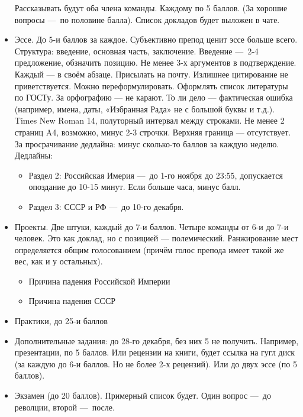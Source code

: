 \documentclass[12pt, a4paper]{article}
\begin{document}
\begin{itemize}
        Рассказывать будут оба члена команды. Каждому по 5 баллов. (За хорошие вопросы — по половине балла). 
        Список докладов будет выложен в чате.
        \item Эссе. До 5-и баллов за каждое. Субъективно препод ценит эссе больше всего. Структура: введение, основная часть, заключение.
        Введение — 2-4 предложение, обзначить позицию.
        Не менее 3-х аргументов в подтверждение. Каждый — в своём абзаце. Присылать на почту. 
        Излишнее цитирование не приветствуется. Можно переформулировать.
        Оформлять список литературы по ГОСТу.
        За орфографию — не карают. То ли дело — фактическая ошибка (например, имена, даты, «Избранная Рада» не с большой буквы и т.д.).
        Times New Roman 14, полуторный интервал между строками. Не менее 2 страниц A4, возможно, минус 2-3 строчки. Верхняя граница — отсутствует. 
        За просрачивание дедлайна: минус сколько-то баллов за каждую неделю. Дедлайны:
        \begin{itemize}
            \item Раздел 2: Российская Имерия — до 1-го ноября до 23:55, допускается опоздание до 10-15 минут. Если больше часа, минус балл.
            \item Раздел 3: СССР и РФ — до 10-го декабря.
        \end{itemize}
        \item Проекты. Две штуки, каждый до 7-и баллов.
        Четыре команды от 6-и до 7-и человек.
        Это как доклад, но с позицией — полемический.
        Ранжирование мест определяется общим голосованием (причём голос препода имеет такой же вес, как и у остальных).
        \begin{itemize}
            \item Причина падения Российской Империи
            \item Причина падения СССР
        \end{itemize}
        \item Практики, до 25-и баллов
        \item Дополнительные задания: до 28-го декабря, без них 5 не получить. Например, презентации, по 5 баллов. 
        Или рецензии на книги, будет ссылка на гугл диск (за каждую до 6-и баллов. Но не более 2-х рецензий).
        Или до двух эссе (по 5 баллов).
        \item Экзамен (до 20 баллов). Примерный список будет. Один вопрос — до револции, второй — после.
    \end{itemize}
\end{document}
